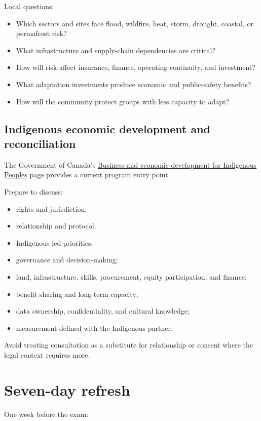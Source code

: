 \documentclass[11pt,letterpaper,oneside,openany]{book}
\begin{document}
Local questions:


\begin{itemize}
\item Which sectors and sites face flood, wildfire, heat, storm, drought, coastal, or permafrost risk?
\item What infrastructure and supply-chain dependencies are critical?
\item How will risk affect insurance, finance, operating continuity, and investment?
\item What adaptation investments produce economic and public-safety benefits?
\item How will the community protect groups with less capacity to adapt?
\end{itemize}


\subsection[Indigenous economic development and reconciliation]{Indigenous economic development and reconciliation}
The Government of Canada's \href{https://www.canada.ca/en/services/indigenous-peoples/business-and-economic-development-indigenous-peoples.html}{Business and economic development for Indigenous Peoples} page provides a current program entry point.


Prepare to discuss:


\begin{itemize}
\item rights and jurisdiction;
\item relationship and protocol;
\item Indigenous-led priorities;
\item governance and decision-making;
\item land, infrastructure, skills, procurement, equity participation, and finance;
\item benefit sharing and long-term capacity;
\item data ownership, confidentiality, and cultural knowledge;
\item measurement defined with the Indigenous partner.
\end{itemize}


Avoid treating consultation as a substitute for relationship or consent where the legal context requires more.


\section[Seven-day refresh]{Seven-day refresh}
One week before the exam:
\end{document}
